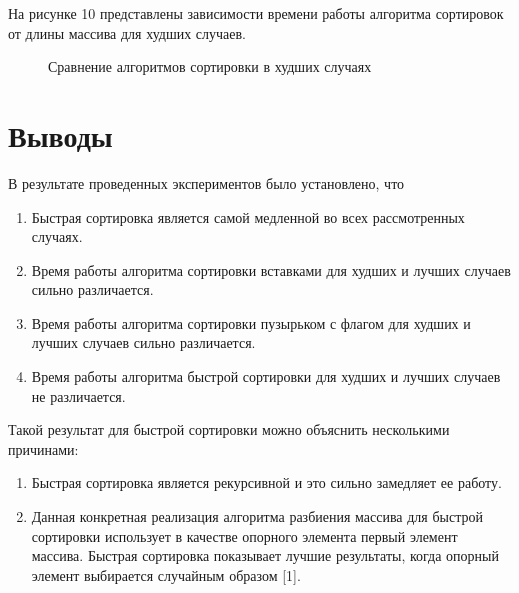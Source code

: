 \documentclass[a4paper,14pt]{report}
\begin{document}
На рисунке 10 представлены зависимости времени работы алгоритма сортировок от длины массива для худших случаев.

\begin{figure}[!h]
	\caption{Сравнение алгоритмов сортировки в худших случаях}
\end{figure}

\newpage

\section*{Выводы}

В результате проведенных экспериментов было установлено, что

\begin{enumerate}
	\item Быстрая сортировка является самой медленной во всех рассмотренных случаях.
	\item Время работы алгоритма сортировки вставками для худших и лучших случаев сильно различается.
	\item Время работы алгоритма сортировки пузырьком с флагом для худших и лучших случаев сильно различается.
	\item Время работы алгоритма быстрой сортировки для худших и лучших случаев не различается.
\end{enumerate}

Такой результат для быстрой сортировки можно объяснить несколькими причинами:

\begin{enumerate}
	\item Быстрая сортировка является рекурсивной и это сильно замедляет ее работу.
	\item Данная конкретная реализация алгоритма разбиения массива для быстрой сортировки использует в качестве опорного элемента первый элемент массива. Быстрая сортировка показывает лучшие результаты, когда опорный элемент выбирается случайным образом [1].
\end{enumerate}
\end{document}
